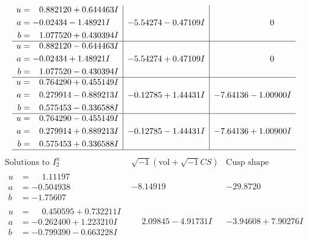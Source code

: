 \documentclass[1p]{elsarticle_modified}
\theoremstyle{definition}
\newcommand{\I}{\sqrt{-1}}
\begin{document}
$$\begin{array}{c|c|c}
\begin{aligned}
u &= \phantom{-}0.882120 + 0.644463 I \\
a &= -0.02434 - 1.48921 I \\
b &= \phantom{-}1.077520 + 0.430394 I\end{aligned}
 & -5.54274 - 0.47109 I & \phantom{-0.000000 } 0 \\ \hline\begin{aligned}
u &= \phantom{-}0.882120 - 0.644463 I \\
a &= -0.02434 + 1.48921 I \\
b &= \phantom{-}1.077520 - 0.430394 I\end{aligned}
 & -5.54274 + 0.47109 I & \phantom{-0.000000 } 0 \\ \hline\begin{aligned}
u &= \phantom{-}0.764290 + 0.455149 I \\
a &= \phantom{-}0.279914 - 0.889213 I \\
b &= \phantom{-}0.575453 - 0.336588 I\end{aligned}
 & -0.12785 + 1.44431 I & -7.64136 - 1.00900 I \\ \hline\begin{aligned}
u &= \phantom{-}0.764290 - 0.455149 I \\
a &= \phantom{-}0.279914 + 0.889213 I \\
b &= \phantom{-}0.575453 + 0.336588 I\end{aligned}
 & -0.12785 - 1.44431 I & -7.64136 + 1.00900 I\\
 \hline 
 \end{array}$$\newpage$$\begin{array}{c|c|c}  
\text{Solutions to }I^u_{2}& \I (\text{vol} + \sqrt{-1}CS) & \text{Cusp shape}\\
 \hline 
\begin{aligned}
u &= \phantom{-}1.11197\phantom{ +0.000000I} \\
a &= -0.504938\phantom{ +0.000000I} \\
b &= -1.75607\phantom{ +0.000000I}\end{aligned}
 & -8.14919\phantom{ +0.000000I} & -29.8720\phantom{ +0.000000I} \\ \hline\begin{aligned}
u &= \phantom{-}0.450595 + 0.732211 I \\
a &= -0.262400 + 1.223210 I \\
b &= -0.799390 - 0.663228 I\end{aligned}
 & \phantom{-}2.09845 - 4.91731 I & -3.94608 + 7.90276 I \\ \hline\begin{aligned}

\end{aligned}
\end{array}$$
\end{document}
